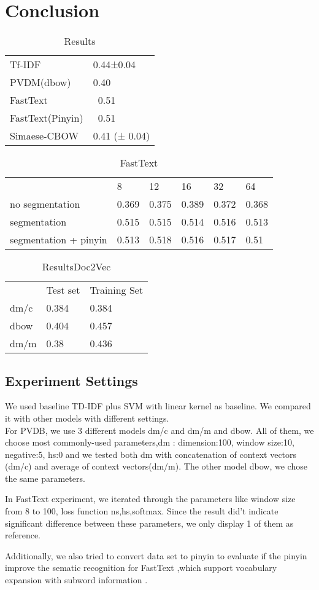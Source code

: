 \chapter{Conclusion}

\begin{table}[]
\centering
\caption{Results}
\label{resultAll}
\begin{tabular}{ll}
Tf-IDF   & 0.44±0.04 \\
PVDM(dbow) & 0.40    \\
FastText &  ~0.51   \\
FastText(Pinyin) &  ~0.51  \\
Simaese-CBOW & 0.41 (± 0.04)
\end{tabular}
\end{table}

\begin{table}[]
\centering
\caption{FastText}
\label{fasttext}
\begin{tabular}{llllll}
   & 8 & 12 & 16 & 32 & 64 \\
no segmentation  & 0.369 & 0.375 & 0.389 & 0.372 & 0.368 \\
segmentation  & 0.515 & 0.515 & 0.514 & 0.516 & 0.513 \\
segmentation + pinyin  & 0.513 & 0.518 & 0.516 & 0.517 & 0.51 \\
\end{tabular}
\end{table}

\begin{table}[]
\centering
\caption{ResultsDoc2Vec}
\label{resultAll}
\begin{tabular}{lll}
      & Test set & Training Set \\
dm/c  & 0.384 &  0.384 \\
dbow &  0.404  & 0.457 \\
dm/m &  0.38  & 0.436
\end{tabular}
\end{table}


\section{Experiment Settings}


We used baseline TD-IDF plus SVM with linear kernel as baseline. We compared it with other models with different settings. \\

For PVDB, we use 3 different models dm/c and dm/m and dbow. All of them, we choose most commonly-used parameters,dm : dimension:100, window size:10, negative:5, hs:0 and we tested both dm with concatenation of context vectors (dm/c) and average of context vectors(dm/m). The other model dbow, we chose the same parameters.

In FastText experiment, we iterated through the parameters like window size from 8 to 100, loss function ns,hs,softmax.  Since the result did't indicate significant difference between these parameters, we only display 1 of them as reference.

Additionally, we also tried to convert data set to pinyin to evaluate if the pinyin improve the sematic recognition for FastText ,which support vocabulary expansion with subword information \cite{bojanowski2016enriching}. 